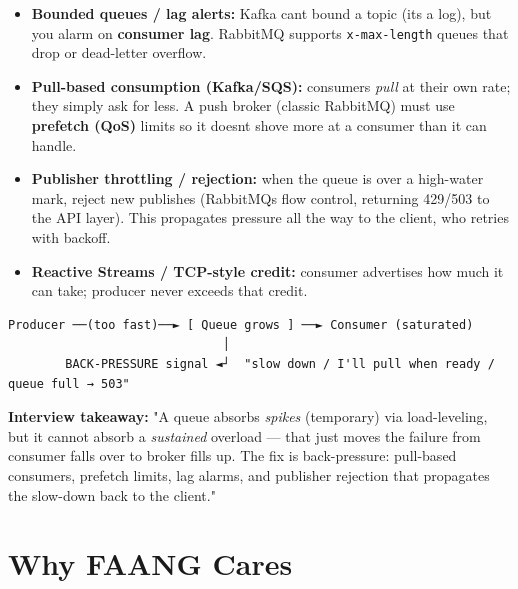 \documentclass[11pt]{article}
\providecommand{\tightlist}{\setlength{\itemsep}{1pt}\setlength{\parskip}{0pt}}
\begin{document}
\begin{itemize}
\tightlist
\item
  \textbf{Bounded queues / lag alerts:} Kafka can\textquotesingle t bound a topic (it\textquotesingle s a log), but you alarm on \textbf{consumer lag}. RabbitMQ supports \texttt{x-max-length} queues that drop or dead-letter overflow.
\item
  \textbf{Pull-based consumption (Kafka/SQS):} consumers \emph{pull} at their own rate; they simply ask for less. A push broker (classic RabbitMQ) must use \textbf{prefetch (QoS)} limits so it doesn\textquotesingle t shove more at a consumer than it can handle.
\item
  \textbf{Publisher throttling / rejection:} when the queue is over a high-water mark, reject new publishes (RabbitMQ\textquotesingle s flow control, returning 429/503 to the API layer). This propagates pressure all the way to the client, who retries with backoff.
\item
  \textbf{Reactive Streams / TCP-style credit:} consumer advertises how much it can take; producer never exceeds that credit.
\end{itemize}

\setcodelang{}

\begin{verbatim}
Producer ──(too fast)──► [ Queue grows ] ──► Consumer (saturated)
                              │
        BACK-PRESSURE signal ◄┘  "slow down / I'll pull when ready / queue full → 503"
\end{verbatim}

\textbf{Interview takeaway:} "A queue absorbs \emph{spikes} (temporary) via load-leveling, but it cannot absorb a \emph{sustained} overload --- that just moves the failure from \textquotesingle consumer falls over\textquotesingle{} to \textquotesingle broker fills up.\textquotesingle{} The fix is back-pressure: pull-based consumers, prefetch limits, lag alarms, and publisher rejection that propagates the slow-down back to the client."

\section{Why FAANG Cares}\label{why-faang-cares}
\end{document}
